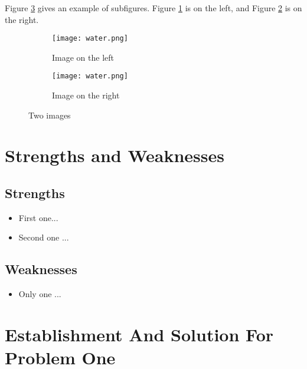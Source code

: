 \documentclass[12pt]{article}  %
\begin{document}
Figure \ref{fig:subfigures} gives an example of subfigures. Figure \ref{subfig:left} is on the left, and Figure \ref{subfig:right} is on the right.

\begin{figure}[htbp]
\centering
\begin{subfigure}[b]{.4\textwidth}
\texttt{[image: water.png]}
\caption{Image on the left}\label{subfig:left}
\end{subfigure}
\begin{subfigure}[b]{.4\textwidth}
\texttt{[image: water.png]}
\caption{Image on the right}\label{subfig:right}
\end{subfigure}
\caption{Two images}\label{fig:subfigures}
\end{figure}

\section{Strengths and Weaknesses}
\subsection{Strengths}
\begin{itemize}
    \item First one...
    \item Second one ...
\end{itemize}

\subsection{Weaknesses}
\begin{itemize}
    \item Only one ...
 \end{itemize}


\section{Establishment And Solution For Problem One}
\end{document}
